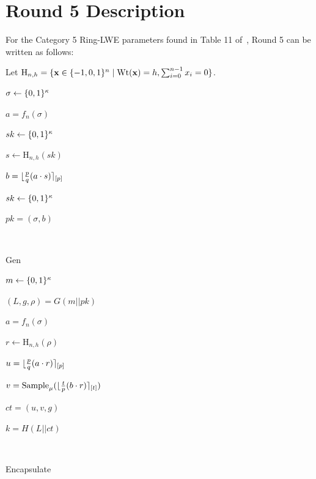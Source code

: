 \section{Round 5 Description}
\label{sec:round-5-desc}

For the Category 5 Ring-LWE parameters found in Table 11
of~\cite{Round5_NISTPQCRound2}, Round 5 can be written as follows:

Let $\text{H}_{n,h} = \{\mathbf{x} \in \{-1,0,1\}^{n} \mid
\text{Wt}(\mathbf{x})=h,\sum_{i=0}^{n-1}x_i=0\}$.

\begin{algorithm}

    $\sigma \gets \{0,1\}^{\kappa}$\

    $a = f_{n}(\sigma)$\

    $sk \gets \{0,1\}^{\kappa}$\

    $s \gets \text{H}_{n,h}(sk)$\

    $b = \lfloor\tfrac{p}{q}(a\cdot s)\rceil_{[p]}$\

    $sk \gets \{0,1\}^{\kappa}$\

    $pk = (\sigma,b)$\

    \

    \caption{Gen}
\end{algorithm}

\begin{algorithm}

    $m \gets \{0,1\}^{\kappa}$\

    $(L,g,\rho)=G(m||pk)$\

    $a=f_{n}(\sigma)$\
    
    $r \gets \text{H}_{n,h}(\rho)$\

    $u=\lfloor\tfrac{p}{q}(a\cdot r)\rceil_{[p]}$\

    $v=\text{Sample}_{\mu}(\lfloor\tfrac{t}{p} (b \cdot r)\rceil_{[t]})$\

    $ct=(u,v,g)$\

    $k=H(L||ct)$\

    \

    \caption{Encapsulate}
\end{algorithm}

